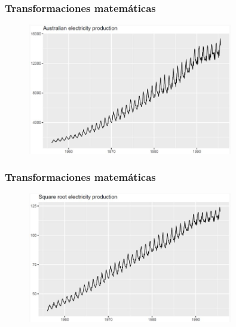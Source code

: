 \documentclass[10pt]{beamer}
\begin{document}
\begin{frame}[fragile]
\frametitle{Transformaciones matemáticas}


\begin{figure}
\begin{center}
    \includegraphics[width=0.8\textwidth]{Imagen4.JPG}
\end{center}
\end{figure}


\end{frame}




\begin{frame}[fragile]
\frametitle{Transformaciones matemáticas}


\begin{figure}
\begin{center}
    \includegraphics[width=0.8\textwidth]{Imagen5.JPG}
\end{center}
\end{figure}


\end{frame}


\end{document}

